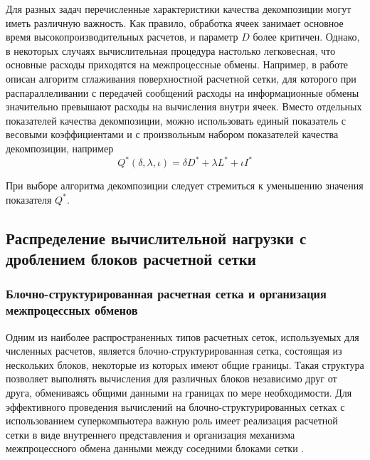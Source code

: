 Для разных задач перечисленные характеристики качества декомпозиции могут иметь различную важность.
Как правило, обработка ячеек занимает основное время высокопроизводительных расчетов, и параметр $D$ более критичен.
Однако, в некоторых случаях вычислительная процедура настолько легковесная, что основные расходы приходятся на межпроцессные обмены.
Например, в работе \cite{Tong2017Remesh} описан алгоритм сглаживания поверхностной расчетной сетки, для которого при распараллеливании с передачей сообщений расходы на информационные обмены значительно превышают расходы на вычисления внутри ячеек.
Вместо отдельных показателей качества декомпозиции, можно использовать единый показатель с весовыми коэффициентами и с произвольным набором показателей качества декомпозиции, например
\begin{equation}
	Q^{*}(\delta, \lambda, \iota) = \delta D^{*} + \lambda L^{*} + \iota I^{*}
\end{equation}

При выборе алгоритма декомпозиции следует стремиться к уменьшению значения показателя $Q^{*}$.


\subsection{Распределение вычислительной нагрузки с дроблением блоков расчетной сетки}

\subsubsection{Блочно-структурированная расчетная сетка и организация межпроцессных обменов}

Одним из наиболее распространенных типов расчетных сеток, используемых для численных расчетов, является блочно-структурированная сетка, состоящая из нескольких блоков, некоторые из которых имеют общие границы.
Такая структура позволяет выполнять вычисления для различных блоков независимо друг от друга, обмениваясь общими данными на границах по мере необходимости.
Для эффективного проведения вычислений на блочно-структурированных сетках с использованием суперкомпьютера важную роль имеет реализация расчетной сетки в виде внутреннего представления и организация механизма межпроцессного обмена данными между соседними блоками сетки \cite{Rybakov2017Mesh}.

